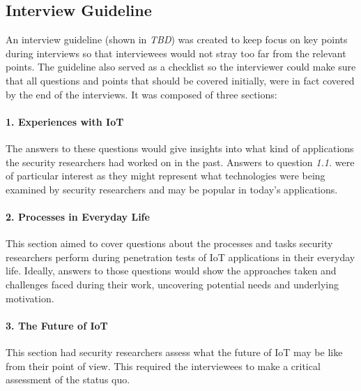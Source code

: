 \subsection{Interview Guideline}
An interview guideline (shown in \emph{TBD}) %
was created to keep focus on key points during interviews so that interviewees would not stray too far from the relevant points. The guideline also served as a checklist so the interviewer could make sure that all questions and points that should be covered  initially, were in fact covered by the end of the interviews. It was composed of three sections:

\paragraph{1. Experiences with IoT} The answers to these questions would give insights into what kind of applications the security researchers had worked on in the past. Answers to question \emph{1.1.} were of particular interest as they might represent what technologies were being examined by security researchers and may be popular in today’s applications.
\paragraph{2. Processes in Everyday Life} This section aimed to cover questions about the processes and tasks security researchers perform during penetration tests of IoT applications in their everyday life. Ideally, answers to those questions would show the approaches taken and challenges faced during their work, uncovering potential needs and underlying motivation.
\paragraph{3. The Future of IoT} This section had security researchers assess what the future of IoT may be like from their point of view. This required the interviewees to make a critical assessment of the status quo.


